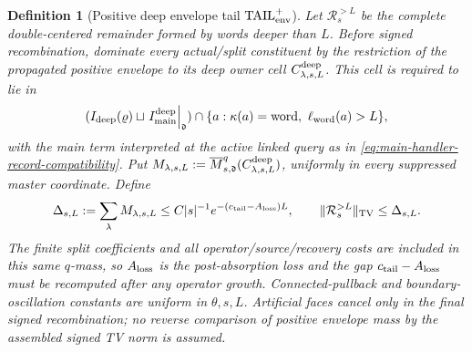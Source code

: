 \documentclass[11pt]{article}
\newtheorem{definition}[theorem]{Definition}
\begin{document}
\begin{definition}[Positive deep envelope tail
$\mathrm{TAIL}_{\rm env}^{+}$]
\label{def:deep-envelope-tail}
Let $\mathcal R_s^{>L}$ be the complete double-centered remainder formed by
words deeper than $L$.  Before signed recombination, dominate every
actual/split constituent by the restriction of the propagated positive
envelope to its deep owner cell $C_{\lambda,s,L}^{\rm deep}$.  This cell is
required to lie in
\begin{equation}
\label{eq:deep-owner-record-compatibility}
 (I_{\rm deep}(\varrho)\sqcup
   \left.I_{\rm main}^{\rm deep}\right|_{\mathfrak d})
 \cap\{a:\kappa(a)={\rm word},\ \ell_{\rm word}(a)>L\},
\end{equation}
with the main term interpreted at the active linked query as in
\eqref{eq:main-handler-record-compatibility}.  Put
$M_{\lambda,s,L}:=
\overline M_{s,\mathfrak d}^{q}(C_{\lambda,s,L}^{\rm deep})$, uniformly in
every suppressed master coordinate.  Define
\begin{equation}
\label{eq:deep-positive-envelope-mass}
 \Delta_{s,L}:=\sum_\lambda M_{\lambda,s,L}
 \le C|s|^{-1}e^{-(c_{\rm tail}-A_{\rm loss})L},
 \qquad
 \|\mathcal R_s^{>L}\|_{\rm TV}\le\Delta_{s,L}.
\end{equation}
The finite split coefficients and all operator/source/recovery costs are
included in this same $q$-mass, so $A_{\rm loss}$ is the post-absorption
loss and the gap $c_{\rm tail}-A_{\rm loss}$ must be recomputed after any
operator growth.  Connected-pullback
and boundary-oscillation constants are uniform in $\theta,s,L$.
Artificial faces cancel only in the final signed recombination; no reverse
comparison of positive envelope mass by the assembled signed TV norm is
assumed.
\end{definition}
\end{document}
